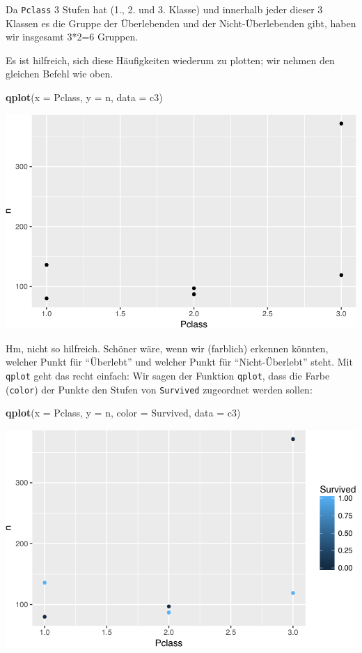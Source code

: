 \documentclass[12pt,ngerman,]{book}
\newenvironment{Shaded}{\begin{snugshade}}{\end{snugshade}}
\newcommand{\KeywordTok}[1]{\textcolor[rgb]{0.13,0.29,0.53}{\textbf{{#1}}}}
\newcommand{\DataTypeTok}[1]{\textcolor[rgb]{0.13,0.29,0.53}{{#1}}}
\newcommand{\NormalTok}[1]{{#1}}
\renewenvironment{Shaded}{\begin{kframe}}{\end{kframe}}
\begin{document}
Da \texttt{Pclass} 3 Stufen hat (1., 2. und 3. Klasse) und innerhalb
jeder dieser 3 Klassen es die Gruppe der Überlebenden und der
Nicht-Überlebenden gibt, haben wir insgesamt 3*2=6 Gruppen.

Es ist hilfreich, sich diese Häufigkeiten wiederum zu plotten; wir
nehmen den gleichen Befehl wie oben.

\begin{Shaded}
\begin{Highlighting}[]
\KeywordTok{qplot}\NormalTok{(}\DataTypeTok{x =} \NormalTok{Pclass, }\DataTypeTok{y =} \NormalTok{n, }\DataTypeTok{data =} \NormalTok{c3)}
\end{Highlighting}
\end{Shaded}

\begin{center}\includegraphics[width=0.7\linewidth]{075_Fallstudie_Titanic_files/figure-latex/unnamed-chunk-5-1} \end{center}

Hm, nicht so hilfreich. Schöner wäre, wenn wir (farblich) erkennen
könnten, welcher Punkt für ``Überlebt'' und welcher Punkt für
``Nicht-Überlebt'' steht. Mit \texttt{qplot} geht das recht einfach: Wir
sagen der Funktion \texttt{qplot}, dass die Farbe (\texttt{color}) der
Punkte den Stufen von \texttt{Survived} zugeordnet werden sollen:

\begin{Shaded}
\begin{Highlighting}[]
\KeywordTok{qplot}\NormalTok{(}\DataTypeTok{x =} \NormalTok{Pclass, }\DataTypeTok{y =} \NormalTok{n, }\DataTypeTok{color =} \NormalTok{Survived, }\DataTypeTok{data =} \NormalTok{c3)}
\end{Highlighting}
\end{Shaded}

\begin{center}\includegraphics[width=0.7\linewidth]{075_Fallstudie_Titanic_files/figure-latex/unnamed-chunk-6-1} \end{center}
\end{document}
